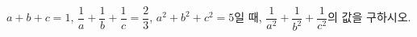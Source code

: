 $a+b+c=1$, $\dfrac{1}{a}+\dfrac{1}{b}+\dfrac{1}{c}=\dfrac{2}{3}$, $a^2+b^2+c^2=5$일 때, $\dfrac{1}{a^2}+\dfrac{1}{b^2}+\dfrac{1}{c^2}$의 값을 구하시오.
